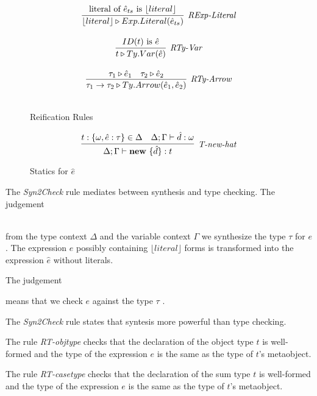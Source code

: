 \begin{figure}
\begin{minipage}{.5\textwidth}
\[\begin{array}{c}
\infer[\textit{RExp-Literal}]
	{ \lfloor literal \rfloor \triangleright Exp.Literal( \hat{e}_{ts} )  }
	{ \text{literal of}\ \hat{e}_{ts}\ \text{is}\ \lfloor literal \rfloor  } \\[3ex]

\infer[\textit{RTy-Var}]
	{ t \triangleright Ty.Var(\hat{e})   }
	{ ID(t)\ \text{is}\ \hat{e}} \\[3ex]

\infer[\textit{RTy-Arrow}]
	{ \tau_1 \rightarrow \tau_2 \triangleright Ty.Arrow(\hat{e}_1,\hat{e}_2 )  }
	{ \tau_1 \triangleright \hat{e}_1 & \tau_2 \triangleright \hat{e}_2 } \\[3ex]
   
\end{array}
\]
\caption{Reification Rules}
\end{minipage}
\end{figure}


\begin{figure}
\centering
\[
\infer[\textit{T-new-hat}]
	{\Delta; \Gamma \vdash \keyw{new}\ \{ \hat d \} :  t }
	{ t:\{\omega, \hat e:\tau\} \in \Delta & \Delta;\Gamma \vdash \hat d : \omega}
\]
\caption{Statics for $\hat e$}
\end{figure}


The \textit{Syn2Check} rule mediates between synthesis and type checking. 
The judgement 

\\
\noindent
from the type context $\Delta$ and the variable context $\Gamma$ we synthesize the type $\tau$ for $e$. The  expression $e$ possibly containing $\lfloor literal \rfloor$ forms is transformed into the expression $\hat{e}$ without literals.

The judgement 


means that we check $e$ against the type $\tau$ . 

The \textit{Syn2Check} rule states that syntesis more powerful than type checking.

The rule \textit{RT-objtype} checks that the declaration of the object type $t$ is well-formed and the type of the expression $e$ is the same as the type of $t$'s metaobject.

The rule \textit{RT-casetype} checks that the declaration of the sum type $t$ is well-formed and the type of the expression $e$ is the same as the type of $t$'s metaobject.


